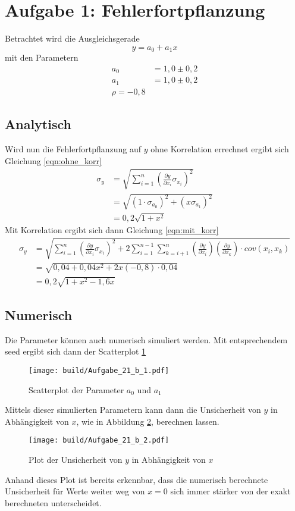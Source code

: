 \section*{Aufgabe 1: Fehlerfortpflanzung}
\label{sec:Aufgabe1}
Betrachtet wird die Ausgleichsgerade
\begin{equation}
    y=a_0+a_1x
\end{equation}
mit den Parametern
\begin{align}
    a_0&=1,0\pm 0,2\nonumber\\
    a_1&=1,0\pm 0,2\nonumber\\
    \rho = -0,8
\end{align}
\subsection*{Analytisch}
\label{sub:Analytisch}
Wird nun die Fehlerfortpflanzung auf $y$ ohne Korrelation errechnet ergibt sich Gleichung \eqref{eqn:ohne_korr}
\begin{align}
    \sigma_y&=\sqrt{\sum_{i=1}^n\left(\frac{\partial y}{\partial x_i}\sigma_{x_i}\right)^2}\nonumber\\
            &=\sqrt{\left(1\cdot\sigma_{a_0}\right)^2+\left(x\sigma_{a_1}\right)^2}\nonumber\\
            &=0,2\sqrt{1+x^2}
            \label{eqn:ohne_korr}
\end{align}
Mit Korrelation ergibt sich dann Gleichung \eqref{eqn:mit_korr}
\begin{align}
    \sigma_y&=\sqrt{\sum_{i=1}^n\left(\frac{\partial y}{\partial x_i}\sigma_{x_i}\right)^2+2\sum_{i=1}^{n-1}\sum_{k=i+1}^{n}\left(\frac{\partial y}{\partial x_i}\right)\left(\frac{\partial y}{\partial x_k}\right)\cdot cov(x_i,x_k)}\nonumber\\
            &=\sqrt{0,04+0,04x^2+2 x (-0,8)\cdot 0,04}\nonumber\\
            &=0,2\sqrt{1+x^2-1,6x}
            \label{eqn:mit_korr}
\end{align}

\subsection*{Numerisch}
\label{sub:Numerisch}
Die Parameter können auch numerisch simuliert werden. Mit entsprechendem seed ergibt sich dann der Scatterplot \ref{fig:A_1_b_1}
\begin{figure}
    \centering
    \texttt{[image: build/Aufgabe\_21\_b\_1.pdf]}
    \caption{Scatterplot der Parameter $a_0$ und $a_1$}
    \label{fig:A_1_b_1}
\end{figure}
Mittels dieser simulierten Parametern kann dann die Unsicherheit von $y$ in Abhängigkeit von $x$, wie in Abbildung \ref{fig:A_1_b_2}, berechnen lassen.
\begin{figure}
    \centering
    \texttt{[image: build/Aufgabe\_21\_b\_2.pdf]}
    \caption{Plot der Unsicherheit von $y$ in Abhängigkeit von $x$}
    \label{fig:A_1_b_2}
\end{figure}
Anhand dieses Plot ist bereits erkennbar, dass die numerisch berechnete Unsicherheit für Werte weiter weg von $x=0$ sich immer stärker von der exakt berechneten unterscheidet.

